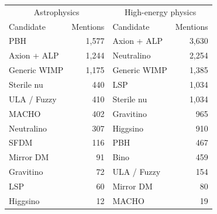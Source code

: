 \begin{tabular}{l r l r}
\toprule
\multicolumn{2}{c}{Astrophysics} & \multicolumn{2}{c}{High-energy physics} \\
Candidate & Mentions & Candidate & Mentions \\
\midrule
PBH & 1,577 & Axion + ALP & 3,630 \\
Axion + ALP & 1,244 & Neutralino & 2,254 \\
Generic WIMP & 1,175 & Generic WIMP & 1,385 \\
Sterile nu & 440 & LSP & 1,034 \\
ULA / Fuzzy & 410 & Sterile nu & 1,034 \\
MACHO & 402 & Gravitino & 965 \\
Neutralino & 307 & Higgsino & 910 \\
SFDM & 116 & PBH & 467 \\
Mirror DM & 91 & Bino & 459 \\
Gravitino & 72 & ULA / Fuzzy & 154 \\
LSP & 60 & Mirror DM & 80 \\
Higgsino & 12 & MACHO & 19 \\
\bottomrule
\end{tabular}
